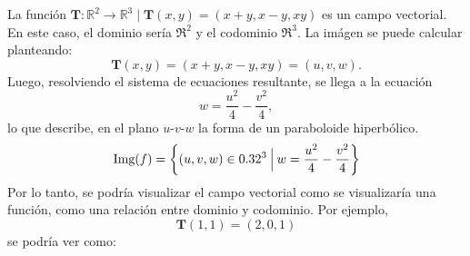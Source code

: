   
    \begin{example}  \label{ej:campoVectorial}
        La función $\mathbf{T}:\mathbb{R}^2 \rightarrow \mathbb{R}^3 \;|\; \mathbf{T}(x,y) = (x+y,x-y,xy)$
        es un campo vectorial. 
        En este caso, el dominio sería $\Re^2$ y el codominio $\Re^3$. La imágen se puede calcular planteando:
        \begin{equation*}
          \mathbf{T}(x,y) = (x+y,x-y,xy) = (u,v,w)  .
        \end{equation*}
        Luego, resolviendo el sistema de ecuaciones resultante, se llega a la ecuación
        \begin{equation*}
          w = \frac{u^2}{4}-\frac{v^2}{4},
        \end{equation*}
        lo que describe, en el plano $u$-$v$-$w$ la forma de un paraboloide hiperbólico.
        \begin{equation*}
          \text{Img}(f)=\left\{ (u,v,w)\in0.32^3 \:\Big|\: w=\frac{u^2}{4}-\frac{v^2}{4} \right\}
        \end{equation*}
        Por lo tanto, se podría visualizar el campo vectorial como se visualizaría una función, como una relación entre
        dominio y codominio. Por ejemplo,
        \begin{equation*}
            \mathbf{T}(1,1)=(2,0,1)
        \end{equation*}
        se podría ver como:

 \begin{figure}[H]
  \begin{center}
\end{center}
\end{figure}
\end{example}
